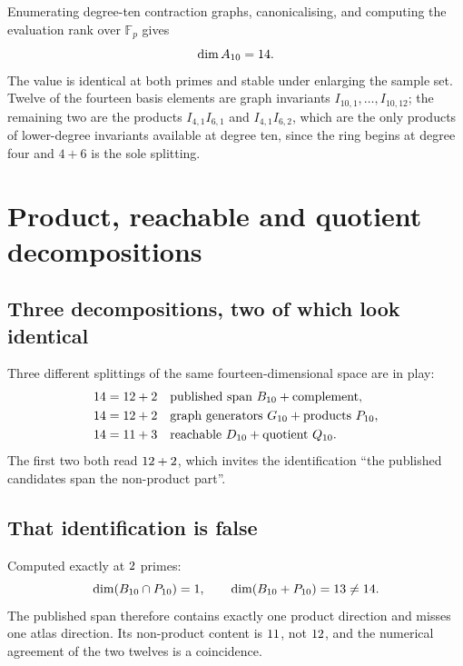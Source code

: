\documentclass[11pt,a4paper]{article}
\begin{document}
Enumerating degree-ten contraction graphs, canonicalising, and computing the
evaluation rank over $\mathbb{F}_p$ gives
\begin{equation}
  \dim A_{10} = 14 .
\end{equation}
The value is identical at both primes and stable under enlarging the sample set.
Twelve of the fourteen basis elements are graph invariants $I_{10,1},\ldots,
I_{10,12}$; the remaining two are the products $I_{4,1}I_{6,1}$ and
$I_{4,1}I_{6,2}$, which are the only products of lower-degree invariants
available at degree ten, since the ring begins at degree four and $4+6$ is the
sole splitting.

\section{Product, reachable and quotient decompositions}
\label{sec:decomp}

\subsection{Three decompositions, two of which look identical}

Three different splittings of the same fourteen-dimensional space are in play:
\begin{align}
  14 &= 12 + 2  &&\text{published span } B_{10} + \text{complement},\\
  14 &= 12 + 2 &&\text{graph generators } G_{10} + \text{products } P_{10},\\
  14 &= 11 + 3 &&\text{reachable } D_{10} + \text{quotient } Q_{10}.
\end{align}
The first two both read $12 + 2$, which invites the identification
``the published candidates span the non-product part''.

\subsection{That identification is false}

Computed exactly at $2$ primes:
\begin{equation}
  \dim(B_{10}\cap P_{10}) = 1,
  \qquad
  \dim(B_{10} + P_{10}) = 13 \ne 14 .
\end{equation}
The published span therefore contains exactly one product direction and misses
one atlas direction. Its non-product content is $11$, not
$12$, and the numerical agreement of the two twelves is a coincidence.
\end{document}
